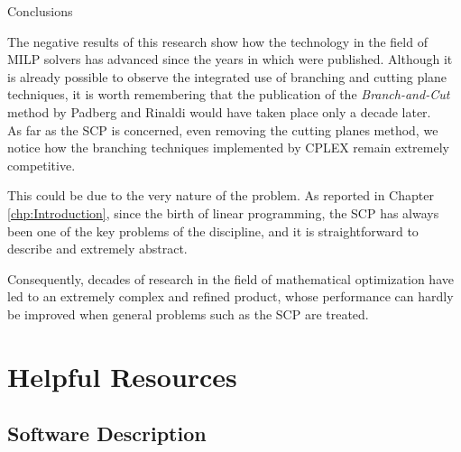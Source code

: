 \documentclass[a4paper,12pt]{mydeitesi_eng}
\begin{document}
\begin{chapter}{Conclusions}
\label{chp:Conclusions}

The negative results of this research show how the technology in the field of MILP solvers has advanced since the years in which \cite{Balas1980-CuttinPlanes} \cite{Balas1980-Computational} were published.
Although it is already possible to observe the integrated use of branching and cutting plane techniques, it is worth remembering that the publication of the \emph{Branch-and-Cut} method by Padberg and Rinaldi \cite{PadbergRinaldi} would have taken place only a decade later.\\

As far as the SCP is concerned, even removing the cutting planes method, we notice how the branching techniques implemented by CPLEX remain extremely competitive.

This could be due to the very nature of the problem.
As reported in Chapter \ref{chp:Introduction}, since the birth of linear programming, the SCP has always been one of the key problems of the discipline, and it is straightforward to describe and extremely abstract.

Consequently, decades of research in the field of mathematical optimization have led to an extremely complex and refined product, whose performance can hardly be improved when general problems such as the SCP are treated.



\end{chapter}



\newpage
\thispagestyle{empty}
\mbox{}



\appendix
\chapter{Helpful Resources}

\section{Software Description}
\end{document}
